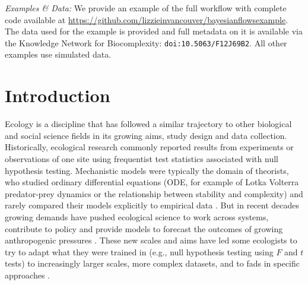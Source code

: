 \documentclass[11pt]{article}
\newcommand{\R}[1]{\label{}\linelabel{#1}}
\begin{document}
\vspace{3ex}
\noindent\emph{Examples \& Data:} We provide an example of the full workflow with complete code available at \url{https://github.com/lizzieinvancouver/bayesianflowsexample}. The data used for the example is provided and full metadata on it is available via the Knowledge Network for Biocomplexity: \verb|doi:10.5063/F12J69B2|. All other examples use simulated data.



\setlength{\parindent}{0pt}
\setlength{\parskip}{7pt}

\newpage

\section*{Introduction}
\R{newintrostart}Ecology is a discipline that has followed a similar trajectory to other biological and social science fields in its growing aims, study design and data collection. Historically, ecological research commonly reported results from experiments or observations of one site using frequentist test statistics associated with null hypothesis testing. Mechanistic models were typically the domain of theorists, who studied ordinary differential equations (ODE, for example of Lotka Volterra predator-prey dynamics or the relationship between stability and complexity) and rarely compared their models explicitly to empirical data \citep[see][]{caswell1988}. But in recent decades growing demands have pushed ecological science to work across systems, contribute to policy and provide models to forecast the outcomes of growing anthropogenic pressures \citep{hak2016sustainable,lindenmayer2010science}. These new scales and aims have led some ecologists to try to adapt what they were trained in (e.g., null hypothesis testing using $F$ and $t$ tests) to increasingly larger scales, more complex datasets, and to fads in specific approaches  \citep{grace2025causal}. %
\end{document}
